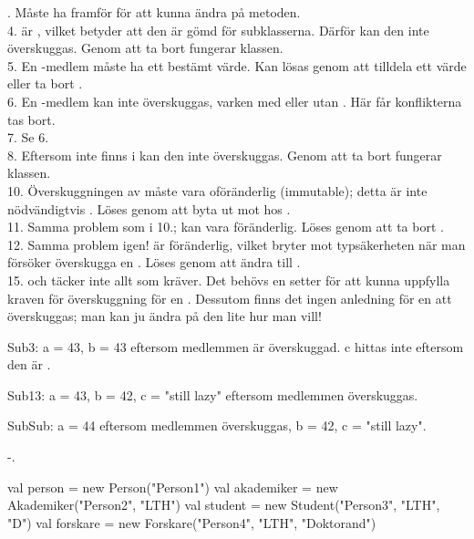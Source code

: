 . Måste ha  framför  för att kunna ändra på metoden. \\
4.  är , vilket betyder att den är gömd för subklasserna. Därför kan den inte överskuggas. Genom att ta bort  fungerar klassen. \\
5. En -medlem måste ha ett bestämt värde. Kan lösas genom att tilldela  ett värde eller ta bort . \\
6. En -medlem kan inte överskuggas, varken med eller utan . Här får konflikterna tas bort.  \\
7. Se 6. \\
8. Eftersom  inte finns i  kan den inte överskuggas. Genom att ta bort  fungerar klassen. \\
10. Överskuggningen av  måste vara oföränderlig (immutable); detta är inte nödvändigtvis . Löses genom att byta ut  mot  hos .  \\
11. Samma problem som i 10.;  kan vara föränderlig. Löses genom att ta bort . \\
12. Samma problem igen!  är föränderlig, vilket bryter mot typsäkerheten när man försöker överskugga en . Löses genom att ändra  till . \\
15. och  täcker inte allt som  kräver. Det behövs en setter för att kunna uppfylla kraven för överskuggning för en . Dessutom finns det ingen anledning för en  att överskuggas; man kan ju ändra på den lite hur man vill!

\Subtask Sub3: a = 43, b = 43 eftersom medlemmen är överskuggad. c hittas inte eftersom den är .

Sub13: a = 43, b = 42, c = "still lazy" eftersom medlemmen överskuggas.

SubSub: a = 44 eftersom medlemmen överskuggas, b = 42, c = "still lazy".

\Subtask -.
 
\Task
 
\Subtask
\begin{Code}
val person = new Person("Person1")
val akademiker = new Akademiker("Person2", "LTH")
val student = new Student("Person3", "LTH", "D")
val forskare = new Forskare("Person4", "LTH", "Doktorand")
\end{Code}

